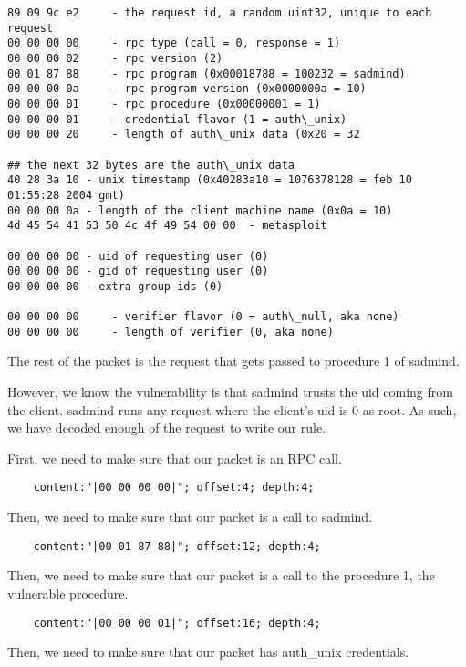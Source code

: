 \documentclass[english]{report}
\begin{document}
\begin{verbatim}
89 09 9c e2     - the request id, a random uint32, unique to each request
00 00 00 00     - rpc type (call = 0, response = 1)
00 00 00 02     - rpc version (2)
00 01 87 88     - rpc program (0x00018788 = 100232 = sadmind)
00 00 00 0a     - rpc program version (0x0000000a = 10)
00 00 00 01     - rpc procedure (0x00000001 = 1)
00 00 00 01     - credential flavor (1 = auth\_unix)
00 00 00 20     - length of auth\_unix data (0x20 = 32

## the next 32 bytes are the auth\_unix data
40 28 3a 10 - unix timestamp (0x40283a10 = 1076378128 = feb 10 01:55:28 2004 gmt)
00 00 00 0a - length of the client machine name (0x0a = 10)
4d 45 54 41 53 50 4c 4f 49 54 00 00  - metasploit

00 00 00 00 - uid of requesting user (0)
00 00 00 00 - gid of requesting user (0)
00 00 00 00 - extra group ids (0)

00 00 00 00     - verifier flavor (0 = auth\_null, aka none)
00 00 00 00     - length of verifier (0, aka none)
\end{verbatim}

The rest of the packet is the request that gets passed to procedure 1 of sadmind.

However, we know the vulnerability is that sadmind trusts the uid coming from the client.  sadmind runs any request where the client's uid is 0 as root.  As such, we have decoded enough of the request to write our rule.  


First, we need to make sure that our packet is an RPC call.
    
\begin{verbatim}
    content:"|00 00 00 00|"; offset:4; depth:4;
\end{verbatim}

Then, we need to make sure that our packet is a call to sadmind.
    
\begin{verbatim}
    content:"|00 01 87 88|"; offset:12; depth:4;
\end{verbatim}

Then, we need to make sure that our packet is a call to the procedure 1, the vulnerable procedure.  
   
\begin{verbatim}
    content:"|00 00 00 01|"; offset:16; depth:4;
\end{verbatim}

Then, we need to make sure that our packet has auth\_unix credentials.  
    
\end{document}
